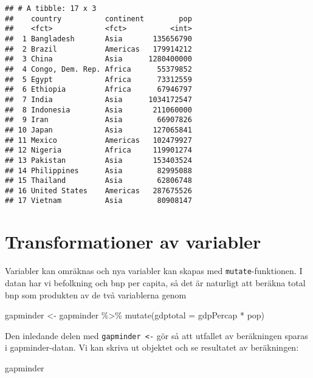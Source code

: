 \documentclass[
]{book}
\newenvironment{Shaded}{\begin{snugshade}}{\end{snugshade}}
\newcommand{\AttributeTok}[1]{\textcolor[rgb]{0.77,0.63,0.00}{#1}}
\newcommand{\FunctionTok}[1]{\textcolor[rgb]{0.00,0.00,0.00}{#1}}
\newcommand{\NormalTok}[1]{#1}
\newcommand{\OtherTok}[1]{\textcolor[rgb]{0.56,0.35,0.01}{#1}}
\newcommand{\SpecialCharTok}[1]{\textcolor[rgb]{0.00,0.00,0.00}{#1}}
\theoremstyle{definition}
\theoremstyle{definition}
\theoremstyle{definition}
\theoremstyle{definition}
\theoremstyle{remark}
\begin{document}
\begin{verbatim}
## # A tibble: 17 x 3
##    country          continent        pop
##    <fct>            <fct>          <int>
##  1 Bangladesh       Asia       135656790
##  2 Brazil           Americas   179914212
##  3 China            Asia      1280400000
##  4 Congo, Dem. Rep. Africa      55379852
##  5 Egypt            Africa      73312559
##  6 Ethiopia         Africa      67946797
##  7 India            Asia      1034172547
##  8 Indonesia        Asia       211060000
##  9 Iran             Asia        66907826
## 10 Japan            Asia       127065841
## 11 Mexico           Americas   102479927
## 12 Nigeria          Africa     119901274
## 13 Pakistan         Asia       153403524
## 14 Philippines      Asia        82995088
## 15 Thailand         Asia        62806748
## 16 United States    Americas   287675526
## 17 Vietnam          Asia        80908147
\end{verbatim}

\hypertarget{transformationer-av-variabler}{%
\section{Transformationer av variabler}\label{transformationer-av-variabler}}

Variabler kan omräknas och nya variabler kan skapas med \texttt{mutate}-funktionen. I datan har vi befolkning och bnp per capita, så det är naturligt att beräkna total bnp som produkten av de två variablerna genom

\begin{Shaded}
\begin{Highlighting}[]
\NormalTok{gapminder }\OtherTok{\textless{}{-}}\NormalTok{ gapminder }\SpecialCharTok{\%\textgreater{}\%} 
  \FunctionTok{mutate}\NormalTok{(}\AttributeTok{gdptotal =}\NormalTok{ gdpPercap }\SpecialCharTok{*}\NormalTok{ pop)}
\end{Highlighting}
\end{Shaded}

Den inledande delen med \texttt{gapminder\ \textless{}-} gör så att utfallet av beräkningen sparas i gapminder-datan.
Vi kan skriva ut objektet och se resultatet av beräkningen:

\begin{Shaded}
\begin{Highlighting}[]
\NormalTok{gapminder}
\end{Highlighting}
\end{Shaded}
\end{document}
